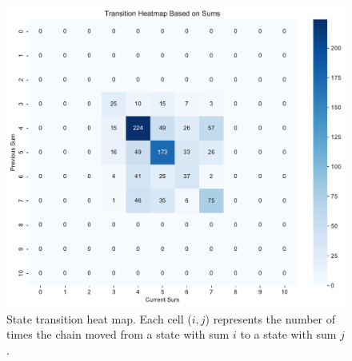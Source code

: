 \begin{figure}[H]
    \centering
    \includegraphics[width=\linewidth]{data/05_reporting/problem_set_2/transition_heatmap.pdf}
    \caption{State transition heat map. Each cell ($i, j$) represents the number of times the chain moved from a state with sum $i$ to a state with sum $j$.}
    \label{fig:enter-label}
\end{figure}